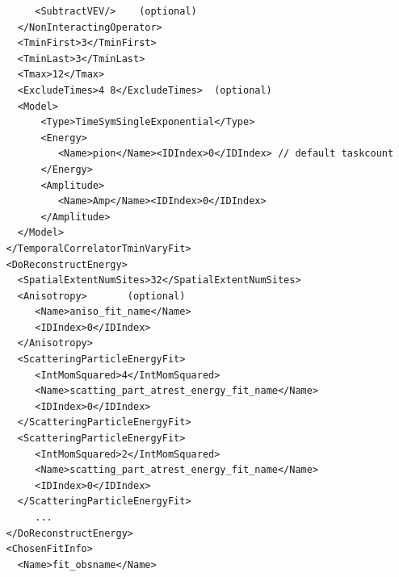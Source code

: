 \documentclass[12pt]{article}
\begin{document}
\begin{verbatim}
        <SubtractVEV/>    (optional)                                    
     </NonInteractingOperator>                                           
     <TminFirst>3</TminFirst>                                            
     <TminLast>3</TminLast>                                              
     <Tmax>12</Tmax>                                                     
     <ExcludeTimes>4 8</ExcludeTimes>  (optional)                        
     <Model>                                                             
         <Type>TimeSymSingleExponential</Type>                           
         <Energy>                                                        
            <Name>pion</Name><IDIndex>0</IDIndex> // default taskcount   
         </Energy>                                                       
         <Amplitude>                                                     
            <Name>Amp</Name><IDIndex>0</IDIndex>                         
         </Amplitude>                                                    
     </Model>                                                            
   </TemporalCorrelatorTminVaryFit>                                      
   <DoReconstructEnergy>                                                 
     <SpatialExtentNumSites>32</SpatialExtentNumSites>                   
     <Anisotropy>       (optional)                                       
        <Name>aniso_fit_name</Name>                                      
        <IDIndex>0</IDIndex>                                             
     </Anisotropy>                                                       
     <ScatteringParticleEnergyFit>                                       
        <IntMomSquared>4</IntMomSquared>                                 
        <Name>scatting_part_atrest_energy_fit_name</Name>                
        <IDIndex>0</IDIndex>                                             
     </ScatteringParticleEnergyFit>                                      
     <ScatteringParticleEnergyFit>                                       
        <IntMomSquared>2</IntMomSquared>                                 
        <Name>scatting_part_atrest_energy_fit_name</Name>                
        <IDIndex>0</IDIndex>                                             
     </ScatteringParticleEnergyFit>                                      
        ...                                                              
   </DoReconstructEnergy>                                                
   <ChosenFitInfo>                                                       
     <Name>fit_obsname</Name>                                            

\end{verbatim}
\end{document}
